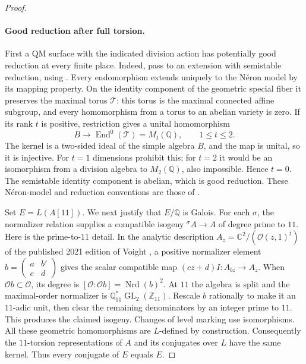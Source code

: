 \documentclass[11pt]{article}
\theoremstyle{definition}
\theoremstyle{remark}
\begin{document}
\begin{proof}
\paragraph{Good reduction after full torsion.}
First a QM surface with the indicated division action has potentially
good reduction at every finite place. Indeed, pass to an extension with
semistable reduction, using \cite[Theorem 3.4, p.~406]{silverbergzarhin}.
Every endomorphism extends uniquely to the N\'eron model by its mapping
property. On the identity component of the geometric special fiber it
preserves the maximal torus $\mathcal T$: this torus is the maximal
connected affine subgroup, and every homomorphism from a torus to an
abelian variety is zero. If its rank $t$ is positive, restriction gives
a unital homomorphism
\[
 B\longrightarrow\operatorname{End}^0(\mathcal T)=M_t(\mathbb Q),
 \qquad 1\le t\le2.
\]
The kernel is a two-sided ideal of the simple algebra $B$, and the map
is unital, so it is injective. For $t=1$ dimensions prohibit this;
for $t=2$ it would be an isomorphism from a division algebra to
$M_2(\mathbb Q)$, also impossible. Hence $t=0$. The semistable identity
component is abelian, which is good reduction. These N\'eron-model and
reduction conventions are those of \cite[\S3, pp.~405--406]{silverbergzarhin}.

Set $E=L(A[11])$. We next justify that $E/\mathbb Q$ is Galois.
For each $\sigma$, the normalizer relation supplies a compatible
isogeny ${}^{\sigma}A\to A$ of degree prime to $11$. Here is the
prime-to-$11$ detail. In the analytic description
$A_z=\mathbb C^2/(\mathcal O(z,1)^t)$ of the published 2021 edition
of Voight \cite[equations (43.1.2)--(43.1.3)]{voight2021}, a positive normalizer element
$b=\left(\begin{smallmatrix}a&b'\\c&d\end{smallmatrix}\right)$
gives the scalar compatible map $(cz+d)I:A_{bz}\to A_z$.
When $\mathcal O b\subset\mathcal O$, its degree is
$[\mathcal O:\mathcal O b]=\operatorname{Nrd}(b)^2$.
At $11$ the algebra is split and the maximal-order normalizer is
$\mathbb Q_{11}^*\operatorname{GL}_2(\mathbb Z_{11})$.
Rescale $b$ rationally to make it an $11$-adic unit, then clear the
remaining denominators by an integer prime to $11$. This produces
the claimed isogeny. Changes of level marking use isomorphisms.
All these geometric homomorphisms are $L$-defined by construction.
Consequently the $11$-torsion representations of $A$ and its conjugates
over $L$ have the same kernel. Thus every conjugate of $E$ equals $E$.


\end{proof}
\end{document}
